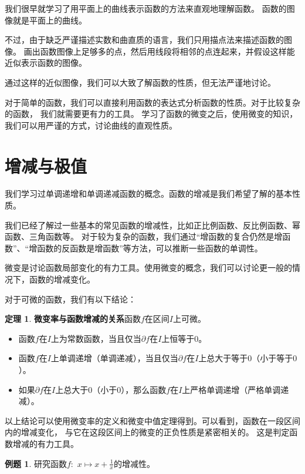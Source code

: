 \documentclass[12pt,UTF8]{ctexbook}
\theoremstyle{definition}
\newtheorem{tm}{定理}[section]
\newtheorem{et}{例题}[section]
\theoremstyle{plain}
\begin{document}
我们很早就学习了用平面上的曲线表示函数的方法来直观地理解函数。
函数的图像就是平面上的曲线。

不过，由于缺乏严谨描述实数和曲直质的语言，我们只用描点法来描述函数的图像。
画出函数图像上足够多的点，然后用线段将相邻的点连起来，并假设这样能近似表示函数的图像。

通过这样的近似图像，我们可以大致了解函数的性质，但无法严谨地讨论。

对于简单的函数，我们可以直接利用函数的表达式分析函数的性质。对于比较复杂的函数，
我们就需要更有力的工具。
学习了函数的微变之后，使用微变的知识，我们可以用严谨的方式，讨论曲线的直观性质。

\section{增减与极值}

我们学习过单调递增和单调递减函数的概念。函数的增减是我们希望了解的基本性质。

我们已经了解过一些基本的常见函数的增减性，比如正比例函数、反比例函数、幂函数、三角函数等。
对于较为复杂的函数，我们通过“增函数的复合仍然是增函数”、“增函数的反函数是增函数”等方法，可以推断一些函数的单调性。

微变是讨论函数局部变化的有力工具。使用微变的概念，我们可以讨论更一般的情况下，函数的增减变化。

对于可微的函数，我们有以下结论：
\begin{tm}{\textbf{微变率与函数增减的关系}}\label{tm:3-1-0}
    函数$f$在区间$I$上可微。
    \begin{itemize}
        \item 函数$f$在$I$上为常数函数，当且仅当$\partial f$在$I$上恒等于$0$。
        \item 函数$f$在$I$上单调递增（单调递减），当且仅当$\partial f$在$I$上总大于等于$0$（小于等于$0$）。
        \item 如果$\partial f$在$I$上总大于$0$（小于$0$），那么函数$f$在$I$上严格单调递增（严格单调递减）。
    \end{itemize} 
\end{tm}
以上结论可以使用微变率的定义和微变中值定理得到。可以看到，函数在一段区间内的增减变化，
与它在这段区间上的微变的正负性质是紧密相关的。
这是判定函数增减的有力工具。

\begin{et}
    研究函数$f:\,\,x\mapsto x + \frac{1}{x}$的增减性。
\end{et}
\end{document}
